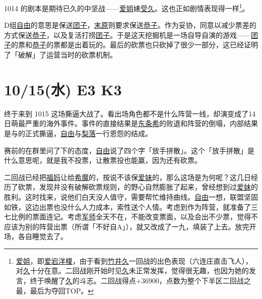 1014 的剧本是期待已久的中坚战——\uline{爱姐}婊\uline{受久}。这也正如剧情表现得一样\footnote{\uline{爱姐}，即\uline{爱宕洋榎}，由于看到\uline{竹井久}一回战的出色表现（六连庄直击飞人），对\uline{久}十分在意。二回战刚开始时见\uline{久}未正常发挥，觉得很无趣，也因为她的发言，终于唤醒了\uline{久}的斗志。二回战得点+36900，点数为整个下半区二回战之最，最后为夺回TOP。}。

D组\uline{自由}的意思是保送\uline{团子}，\uline{末原}则要求保送\uline{恭子}。作为妥协，同意以减少票差的方式保送\uline{恭子}，以及复活打捞\uline{团子}。于是这天挖掘机是一场自导自演的游戏——\uline{团子}的票和\uline{恭子}的票都是出着玩的。最后的砍票也只砍掉了很少一部分，这已经证明了「破解」了运营当时的砍票机制。

\section{10/15(水) E3 K3}


终于来到 1015 这场撕逼大战了。看出场角色都不是什么阵营一线，却演变成了14日萌最严重的海外事件。事件的直接结果是\uline{东条希}的败退和阵营的倒塌，内部结果是与的正式撕逼，\uline{自由}与\uline{梨落}一行恩怨的结成。

赛前的在群里问了下的态度，\uline{自由}说了四个字「放手拼散」。这个「放手拼散」是什么意思呢，就是我不投票，让散票投也能赢，因为还有砍票。

二回战已经把\uline{福妈}让给\uline{希魔}的，按说不该保\uline{爱妹}的，那么这场是为何呢？这几日经历了砍票，发现并没有破解砍票规则，的野心自然膨胀了起来，曾经想到过\uline{爱妹}的胜利。这时找来，说他们白天没人值守，需要帮忙维持曲线。\uline{自由}一想，联盟坚固如铁，这边出票也没什么人力成本，索性送个人情。考虑到作为阵营，就准备了三七比例的票面连记。考虑\uline{军师}全天不在，不能改变票面，以及会出不少票，觉得不应该为别的阵营出票（所谓「不好自A」），就又改成了一九，填装了上去。放完开场，各自睡觉去了。

